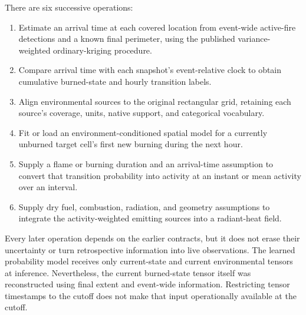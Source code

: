 \documentclass[11pt,a4paper]{article}
\begin{document}
There are six successive operations:
\begin{enumerate}
\item Estimate an arrival time at each covered location from event-wide
active-fire detections and a known final perimeter, using the published
variance-weighted ordinary-kriging procedure.
\item Compare arrival time with each snapshot's event-relative clock to obtain
cumulative burned-state and hourly transition labels.
\item Align environmental sources to the original rectangular grid, retaining
each source's coverage, units, native support, and categorical vocabulary.
\item Fit or load an environment-conditioned spatial model for a currently
unburned target cell's first new burning during the next hour.
\item Supply a flame or burning duration and an arrival-time assumption to
convert that transition probability into activity at an instant or mean activity
over an interval.
\item Supply dry fuel, combustion, radiation, and geometry assumptions to
integrate the activity-weighted emitting sources into a radiant-heat field.
\end{enumerate}

Every later operation depends on the earlier contracts, but it does not erase
their uncertainty or turn retrospective information into live observations.
The learned probability model receives only current-state and current
environmental tensors at inference. Nevertheless, the current burned-state
tensor itself was reconstructed using final extent and event-wide information.
Restricting tensor timestamps to the cutoff does not make that input
operationally available at the cutoff.
\end{document}
